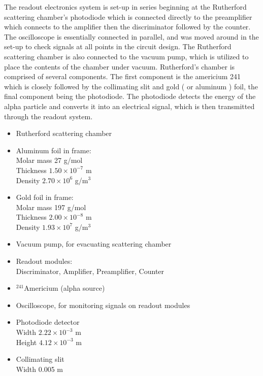 \documentclass[a4paper]{article}
\begin{document}
\qq The readout electronics system is set-up in series beginning at
the Rutherford scattering chamber's photodiode which is connected
directly to the preamplifier which connects to the amplifier then the
discriminator followed by the counter. The oscilloscope is essentially
connected in parallel, and was moved around in the set-up to check
signals at all points in the circuit design. The Rutherford scattering
chamber is also connected to the vacuum pump, which is utilized to
place the contents of the chamber under vacuum. Rutherford's chamber
is comprised of several components. The first component is the
americium 241 which is closely followed by the collimating slit and
gold ( or aluminum ) foil, the final component being the
photodiode. The photodiode detects the energy of the alpha particle
and converts it into an electrical signal, which is then transmitted
through the readout system.

\begin{itemize}
\item Rutherford scattering chamber 
\item Aluminum foil in frame:  \\
      Molar mass 27 g/mol \\
      Thickness $1.50 \times 10^{-7}$ m \\
      Density $2.70 \times 10^6$ g/m$^3$ 
\item Gold foil in frame: \\
      Molar mass 197 g/mol \\
      Thickness $2.00 \times 10^{-8}$ m \\
      Density $1.93 \times 10^7$ g/m$^3$ 
\item Vacuum pump, for evacuating scattering chamber
\item Readout modules: \\
      Discriminator, Amplifier, Preamplifier, Counter
\item $ ^{241}$Americium (alpha source)
\item Oscilloscope, for monitoring signals on readout modules
\item Photodiode detector \\
	  Width $2.22 \times 10^{-3}$ m \\
	  Height $4.12 \times 10^{-3}$ m 
\item Collimating slit \\
      Width 0.005 m 
\end{itemize}
\end{document}
